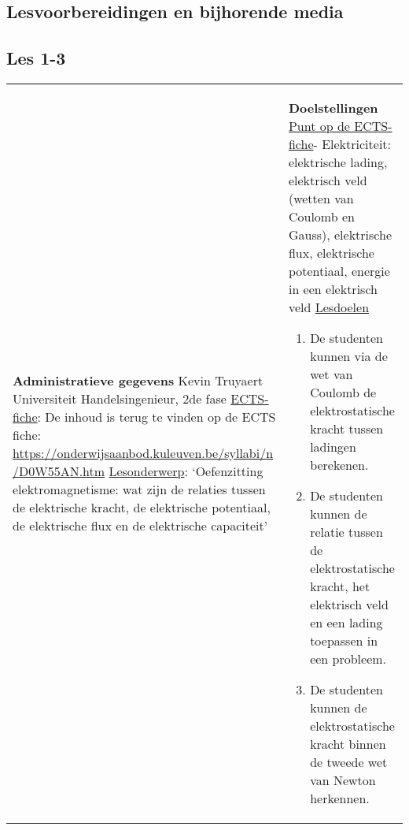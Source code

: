 


\begin{landscape}
	\section{Lesvoorbereidingen en bijhorende media}
	
	\subsection{Les 1-3}
	\begin{tabularx}{1.56\textwidth}{|p{}|X|}\hline
		\textbf{Administratieve gegevens}\newline\newline
		Kevin Truyaert\newline\newline
		Universiteit\newline
		Handelsingenieur, 2de fase\newline
		\underline{ECTS-fiche}: De inhoud is terug te vinden op de ECTS fiche: \href{https://onderwijsaanbod.kuleuven.be/syllabi/n/D0W55AN.htm}{https://onderwijsaanbod.kuleuven.be/syllabi/n /D0W55AN.htm} \newline
		\underline{Lesonderwerp}: `Oefenzitting elektromagnetisme: wat zijn de relaties tussen de elektrische kracht, de  elektrische potentiaal, de elektrische flux en de elektrische capaciteit' & \textbf{Doelstellingen}\newline\vspace{0.5cm}
		\underline{Punt op de ECTS-fiche}\newline - Elektriciteit: elektrische lading, elektrisch veld (wetten van Coulomb en Gauss), elektrische flux, elektrische potentiaal, energie in een elektrisch veld \newline
		\underline{Lesdoelen}\newline
		\vspace{-0.5cm}
		\begin{enumerate}
			\item De studenten kunnen via de wet van Coulomb de elektrostatische kracht tussen ladingen berekenen.
			\item De studenten kunnen de relatie tussen de elektrostatische kracht, het elektrisch veld en een lading toepassen in een probleem.
			\item De studenten kunnen de elektrostatische kracht binnen de tweede wet van Newton herkennen.

\end{enumerate}
\end{tabularx}
\end{landscape}
